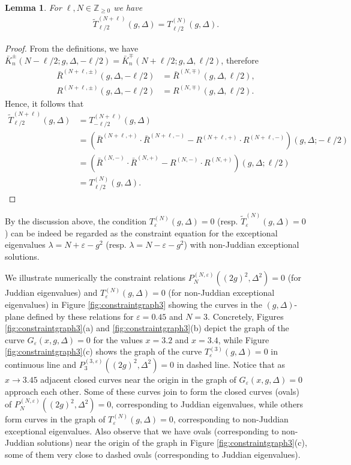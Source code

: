 \documentclass[11pt]{article}
\numberwithin{equation}{section}
\newcommand{\Z}{\mathbb{Z}} %
\newcommand{\e}{\varepsilon}
\newcommand{\cp}[2]{P^{(#1)}_{#2}} %
\theoremstyle{plain}
\newtheorem{lem}[thm]{Lemma}
\theoremstyle{definition}
\theoremstyle{remark}
\begin{document}
\begin{lem}\label{lem:const-T-rel}
  For $\ell,N \in \Z_{\geq 0}$ we have
  \begin{align}\label{eq:const-T-rel}
    \tilde{T}_{\ell/2}^{(N+\ell)}(g,\Delta) =T_{\ell/2}^{(N)}(g,\Delta).
  \end{align}
\end{lem}
\begin{proof}
  From the definitions, we have \(\bar{K}_n^{\pm}(N-\ell/2 ;g,\Delta,-\ell/2) =  \bar{K}_n^{\mp}(N+\ell/2;g,\Delta,\ell/2)\), therefore
  \begin{align*}
    \bar{R}^{(N+\ell,\pm)}(g,\Delta,-\ell/2) &= \bar{R}^{(N,\mp)}(g,\Delta,\ell/2), \\
    R^{(N+\ell,\pm)}(g,\Delta,-\ell/2) &= R^{(N,\mp)}(g,\Delta,\ell/2).
  \end{align*}
  Hence, it follows that
  \begin{align*}
    \tilde{T}_{\ell/2}^{(N+\ell)}(g,\Delta) &= T_{-\ell/2}^{(N+\ell)}(g,\Delta) \\
    &= \left(\bar{R}^{(N+\ell,+)} \cdot \bar{R}^{(N+\ell,-)}- R^{(N+\ell,+)} \cdot R^{(N+\ell,-)} \right) (g,\Delta;-\ell/2) \\
    &= \left(\bar{R}^{(N,-)} \cdot \bar{R}^{(N,+)} - R^{(N,-)} \cdot R^{(N,+)}\right)(g,\Delta;\ell/2) \\
    &= T_{\ell/2}^{(N)}(g,\Delta). 
  \end{align*} 
\end{proof}

By the discussion above, the condition \(T_\e^{(N)}(g,\Delta) = 0\) (resp. \(\tilde{T}_\e^{(N)}(g,\Delta) = 0\)) can be indeed be regarded as
the constraint equation for the exceptional eigenvalues \(\lambda = N + \e - g^2 \) (resp. \(\lambda = N - \e - g^2\)) with non-Juddian
exceptional solutions.

We illustrate numerically the constraint relations \(\cp{N,\e}{N}((2g)^2,\Delta^2) = 0 \) (for Juddian eigenvalues) and  \(T_\e^{(N)}(g,\Delta)= 0\)
(for non-Juddian exceptional eigenvalues) in Figure \ref{fig:constraintgraph3} showing the curves in the \((g,\Delta)\)-plane defined by these
relations for \(\e = 0.45\) and \(N = 3\). Concretely, Figures \ref{fig:constraintgraph3}(a) and \ref{fig:constraintgraph3}(b) depict the
graph of the curve \(G_\e(x,g,\Delta)=0 \) for the values \(x = 3.2 \) and \(x = 3.4 \), while Figure \ref{fig:constraintgraph3}(c) shows the
graph of the curve \(T_\e^{(3)}(g,\Delta)= 0\) in continuous line and \(\cp{3,\e}{3}((2g)^2,\Delta^2) = 0 \) in dashed line. Notice that as \(x \to 3.45\)
adjacent closed curves near the origin in the graph of \(G_\e(x,g,\Delta)=0 \) approach each other. Some of these curves join to form the closed
curves (ovals) of \(\cp{N,\e}{N}((2g)^2,\Delta^2) = 0 \), corresponding to Juddian eigenvalues, while others form curves in the graph of
\(T_\e^{(N)}(g,\Delta)= 0\), corresponding to non-Juddian exceptional eigenvalues. Also observe that we have ovals (corresponding to non-Juddian
solutions) near the origin of the graph in Figure \ref{fig:constraintgraph3}(c), some of them very close to dashed ovals (corresponding to
Juddian eigenvalues).
\end{document}
